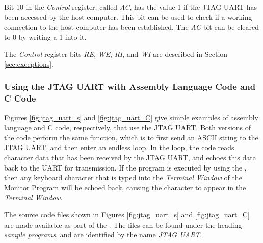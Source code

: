 Bit 10 in the {\it Control} register, called {\it AC}, has the value 1 if the JTAG UART has been
accessed by the host computer. This bit can be used to check if a working connection to
the host computer has been established. The {\it AC} bit can be cleared to 0 by writing a 1
into it.

The {\it Control} register bits {\it RE}, {\it WE}, {\it RI}, and {\it WI} are described 
in Section \ref{sec:exceptions}.

\subsubsection{Using the JTAG UART with Assembly Language Code and C Code}

Figures \ref{fig:jtag_uart_s} and \ref{fig:jtag_uart_C} give simple examples of 
assembly language and C code, respectively, that use the JTAG UART. Both versions of the
code perform the same function, which is to first send an ASCII string to the JTAG UART,
and then enter an endless loop. In the loop, the code reads character data that has 
been received by the JTAG UART, and echoes this data back to the UART for transmission. If the 
program is executed by using the \productNameMed{}, then any keyboard character that 
is typed into the {\it Terminal Window} of the Monitor Program will be 
echoed back, causing the character to appear in the {\it Terminal Window}.

The source code files shown in Figures \ref{fig:jtag_uart_s} and \ref{fig:jtag_uart_C}
are made available as part of the  
\productNameMed{}. The files can be found under the heading {\it sample programs}, 
and are identified by the name {\it JTAG UART}.


